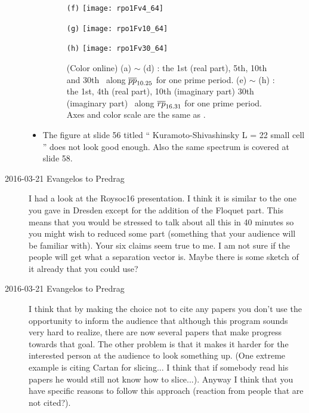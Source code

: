 \begin{description}
\begin{itemize}
\begin{figure}[h]
\begin{minipage}{.115\textwidth}
        \centering \small{\texttt{(f)}}
        \texttt{[image: rpo1Fv4\_64]}
      \end{minipage}
      \begin{minipage}{.115\textwidth}
        \centering \small{\texttt{(g)}}
        \texttt{[image: rpo1Fv10\_64]}
      \end{minipage}
      \begin{minipage}{.115\textwidth}
        \centering \small{\texttt{(h)}}
        \texttt{[image: rpo1Fv30\_64]}
      \end{minipage}%
      \caption{(Color online)
        (a) $\sim$ (d) : the 1st (real part), 5th, 10th and 30th \Fv\ along
        ${\overline{pp}}_{10.25}$ for one prime period.
        (e) $\sim$ (h) : the 1st, 4th (real part), 10th (imaginary part) 30th (imaginary part)
        \Fv\ along ${\overline{rp}}_{16.31}$ for one prime period.
        Axes and color scale are the same as .
      }
      \label{fig:Fvs}
    \end{figure}

  \item The figure at slide 56 titled `` Kuramoto-Shivashinsky L = 22
    small cell '' does not look good enough. Also the same spectrum is
    covered at slide 58.

  \end{itemize}

\item[2016-03-21 Evangelos to Predrag] I had a look at the Roysoc16 presentation.
I think it is similar to the one you gave in Dresden except for the
addition of the Floquet part. This means that you would be stressed to
talk about all this in 40 minutes so you might wish to reduced some part
(something that your audience will be familiar with). Your six claims
seem true to me. I am not sure if the people will get what a separation
vector is. Maybe there is some sketch of it already that you could use?

\item[2016-03-21 Evangelos to Predrag]
I think that by making the choice not to cite any papers you don't use the
opportunity to inform the audience that although this program sounds very hard to
realize, there are now several papers that make progress towards that goal.
The other problem is that it makes it harder for the interested person
at the audience to look something up. (One extreme example is citing Cartan
for slicing... I think that if somebody read his papers he would still not
know how to slice...). Anyway I think that you have specific reasons to follow
this approach (reaction from people that are not cited?).


\end{description}

